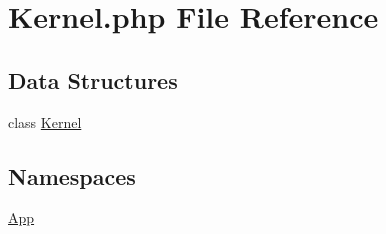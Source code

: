 \hypertarget{_kernel_8php}{}\section{Kernel.\+php File Reference}
\label{_kernel_8php}
\subsection*{Data Structures}
\begin{DoxyCompactItemize}
\item 
class \mbox{\hyperlink{class_app_1_1_kernel}{Kernel}}
\end{DoxyCompactItemize}
\subsection*{Namespaces}
\begin{DoxyCompactItemize}
\item 
 \mbox{\hyperlink{namespace_app}{App}}
\end{DoxyCompactItemize}

